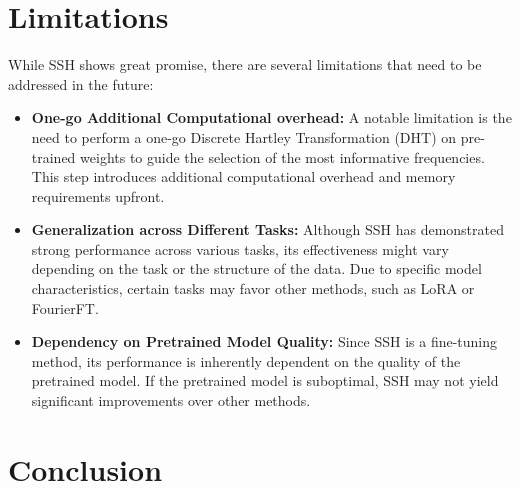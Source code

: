\section{Limitations}

While SSH shows great promise, there are several limitations that need to be addressed in the future:

\begin{itemize}
    \item \textbf{One-go Additional Computational overhead:} A notable limitation is the need to perform a one-go Discrete Hartley Transformation (DHT) on pre-trained weights to guide the selection of the most informative frequencies. This step introduces additional computational overhead and memory requirements upfront.
    

    \item \textbf{Generalization across Different Tasks:} Although SSH has demonstrated strong performance across various tasks, its effectiveness might vary depending on the task or the structure of the data. Due to specific model characteristics, certain tasks may favor other methods, such as LoRA or FourierFT.



    \item \textbf{Dependency on Pretrained Model Quality:} Since SSH is a fine-tuning method, its performance is inherently dependent on the quality of the pretrained model. If the pretrained model is suboptimal, SSH may not yield significant improvements over other methods.


\end{itemize}

\section{Conclusion}

